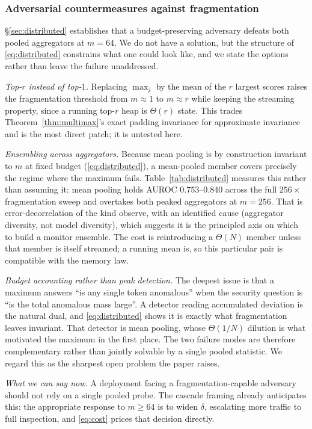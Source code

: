 \documentclass[10pt]{article}
\theoremstyle{plain}
\theoremstyle{definition}
\theoremstyle{remark}
\begin{document}
\subsubsection{Adversarial countermeasures against fragmentation}
\label{sec:countermeasures}

\S\ref{sec:distributed} establishes that a budget-preserving adversary defeats both pooled
aggregators at $m{=}64$. We do not have a solution, but the structure of
\eqref{eq:distributed} constrains what one could look like, and we state the options rather
than leave the failure unaddressed.

\emph{Top-$r$ instead of top-$1$.} Replacing $\max_j$ by the mean of the $r$ largest scores
raises the fragmentation threshold from $m{\approx}1$ to $m{\approx}r$ while keeping the
streaming property, since a running top-$r$ heap is $\Theta(r)$ state. This trades
Theorem~\ref{thm:multimax}'s exact padding invariance for approximate invariance and is the
most direct patch; it is untested here.

\emph{Ensembling across aggregators.} Because mean pooling is by construction invariant to
$m$ at fixed budget (\eqref{eq:distributed}), a mean-pooled member covers precisely the
regime where the maximum fails. Table~\ref{tab:distributed} measures this rather than
assuming it: mean pooling holds AUROC $0.753$--$0.840$ across the full $256\times$
fragmentation sweep and overtakes both peaked aggregators at $m{=}256$. That is
error-decorrelation of the kind \citet{koran2026ensemble} observe, with an identified
cause (aggregator diversity, not model diversity), which suggests it is the principled
axis on which to build a monitor ensemble. The cost is reintroducing a $\Theta(N)$ member
unless that member is itself streamed; a running mean is, so this particular pair is
compatible with the memory law.

\emph{Budget accounting rather than peak detection.} The deepest issue is that a maximum
answers ``is any single token anomalous'' when the security question is ``is the total
anomalous mass large''. A detector reading accumulated deviation is the natural dual, and
\eqref{eq:distributed} shows it is exactly what fragmentation leaves invariant. That
detector is mean pooling, whose $\Theta(1/N)$ dilution is what motivated the maximum in the
first place. The two failure modes are therefore complementary rather than jointly solvable
by a single pooled statistic. We regard this as the sharpest open problem the paper raises.

\emph{What we can say now.} A deployment facing a fragmentation-capable adversary should not
rely on a single pooled probe. The cascade framing already anticipates this: the appropriate
response to $m\ge64$ is to widen $\delta$, escalating more traffic to full inspection, and
\eqref{eq:cost} prices that decision directly.
\end{document}

